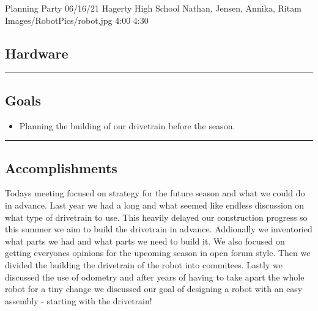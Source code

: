 \insertmeeting 
	{Planning Party} 
	{06/16/21}
	{Hagerty High School}
	{Nathan, Jensen, Annika, Ritam}
	{Images/RobotPics/robot.jpg}
	{4:00}
  {4:30}
	
\subsection*{Hardware}
\noindent\hfil\rule{\textwidth}{.4pt}\hfil
\subsection*{Goals}
\begin{itemize}
    \item Planning the building of our drivetrain before the season.

\end{itemize} 

\noindent\hfil\rule{\textwidth}{.4pt}\hfil

\subsection*{Accomplishments}
Todays meeting focused on strategy for the future season and what we could do in advance. Last year we had a long and what seemed like endless discussion on what type of drivetrain to use. This heavily delayed our construction progress so this summer we aim to build the drivetrain in advance. Addionally we inventoried what parts we had and what parts we need to build it. We also focused on getting everyones opinions for the upcoming season in open forum style. Then we divided the building the drivetrain of the robot into commitees. Lastly we discussed the use of odometry and after years of having to take apart the whole robot for a tiny change we discussed our goal of designing a robot with an easy assembly - starting with the drivetrain!







